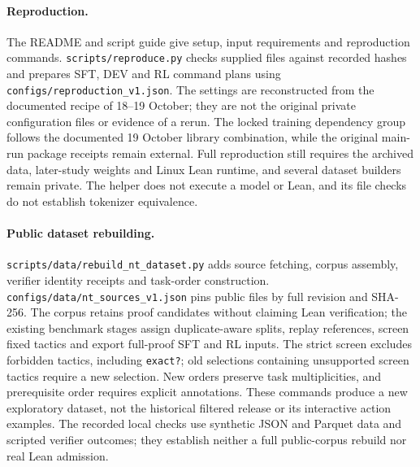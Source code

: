 \documentclass[11pt]{article}
\newcommand{\code}[1]{\texttt{#1}}
\newcommand{\pth}[1]{\nolinkurl{#1}}
\begin{document}
\paragraph{Reproduction.}
The README and script guide give setup, input requirements and reproduction commands.
\pth{scripts/reproduce.py} checks supplied files against recorded hashes and prepares SFT, DEV and RL command plans using \pth{configs/reproduction_v1.json}.
The settings are reconstructed from the documented recipe of 18--19 October; they are not the original private configuration files or evidence of a rerun.
The locked training dependency group follows the documented 19 October library combination, while the original main-run package receipts remain external.
Full reproduction still requires the archived data, later-study weights and Linux Lean runtime, and several dataset builders remain private.
The helper does not execute a model or Lean, and its file checks do not establish tokenizer equivalence.

\paragraph{Public dataset rebuilding.}
\pth{scripts/data/rebuild_nt_dataset.py} adds source fetching, corpus assembly, verifier identity receipts and task-order construction.
\pth{configs/data/nt_sources_v1.json} pins public files by full revision and SHA-256.
The corpus retains proof candidates without claiming Lean verification; the existing benchmark stages assign duplicate-aware splits, replay references, screen fixed tactics and export full-proof SFT and RL inputs.
The strict screen excludes forbidden tactics, including \code{exact?}; old selections containing unsupported screen tactics require a new selection.
New orders preserve task multiplicities, and prerequisite order requires explicit annotations.
These commands produce a new exploratory dataset, not the historical filtered release or its interactive action examples.
The recorded local checks use synthetic JSON and Parquet data and scripted verifier outcomes; they establish neither a full public-corpus rebuild nor real Lean admission.
\end{document}
